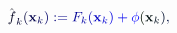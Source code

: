 \documentclass[12pt]{article}
\begin{document}
\makeatletter
\renewcommand*{\@textcolor}[3]{%
  \protect\leavevmode
  \begingroup
    \color#1{#2}#3%
  \endgroup
}
\makeatother
\begin{displaymath}
{\mathcolor[RGB]{0,0,15}{\hat { \mathcolor[RGB]{0,0,30}{f} } }} _ { \mathcolor[RGB]{0,0,45}{k} } \mathcolor[RGB]{0,0,60}{(} \mathbf { \mathcolor[RGB]{0,0,75}{x} } _ { \mathcolor[RGB]{0,0,90}{k} } \mathcolor[RGB]{0,0,105}{)} \mathcolor[RGB]{0,0,120}{:} \mathcolor[RGB]{0,0,135}{=} \mathcolor[RGB]{0,0,150}{F} _ { \mathcolor[RGB]{0,0,165}{k} } \mathcolor[RGB]{0,0,180}{(} \mathbf { \mathcolor[RGB]{0,0,195}{x} } _ { \mathcolor[RGB]{0,0,210}{k} } \mathcolor[RGB]{0,0,225}{)} \mathcolor[RGB]{0,0,240}{+} \mathcolor[RGB]{0,0,255}{\phi} \mathcolor[RGB]{0,15,0}{(} \mathbf { \mathcolor[RGB]{0,15,15}{x} } _ { \mathcolor[RGB]{0,15,30}{k} } \mathcolor[RGB]{0,15,45}{)} \mathcolor[RGB]{0,15,60}{,}
\end{displaymath}
\end{document}
